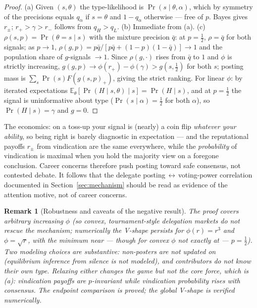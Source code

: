 \documentclass[12pt]{article}
\newtheorem{remark}{Remark}
\newcommand{\E}{\mathbb{E}}
\newcommand{\Pro}{\Pr}
\begin{document}
\begin{proof}
(a) Given $(s,\theta)$ the type-likelihood is $\Pro(s\mid\theta,\alpha)$, which
by symmetry of the precisions equals $q_\alpha$ if $s=\theta$ and $1-q_\alpha$
otherwise --- free of $p$. Bayes gives $r_\pm$; $r_+>\gamma>r_-$ follows from
$q_H>q_L$. (b) Immediate from (a). (c) $\rho(s,p)=\Pro(\theta=s\mid s)$ with the
mixture precision $\bar q$: at $p=\tfrac12$, $\rho=\bar q$ for both signals; as
$p\to1$, $\rho(g,p)=p\bar q/[p\bar q+(1-p)(1-\bar q)]\to1$ and the population
share of $g$-signals $\to1$. Since $\rho(g,\cdot)$ rises from $\bar q$ to $1$
and $\phi$ is strictly increasing, $g(g,p)\to\phi(r_+)-\phi(\gamma)>g(s,\tfrac12)$
for both $s$; posting mass is $\sum_s\Pro(s)F(g(s,p)_+)$, giving the strict
ranking. For linear $\phi$: by iterated expectations
$\E_\theta[\Pro(H\mid s,\theta)\mid s]=\Pro(H\mid s)$, and at $p=\tfrac12$ the
signal is uninformative about type ($\Pro(s\mid\alpha)=\tfrac12$ for both
$\alpha$), so $\Pro(H\mid s)=\gamma$ and $g=0$.
\end{proof}

The economics: on a toss-up your signal is (nearly) a coin flip \emph{whatever
your ability}, so being right is barely diagnostic in expectation --- and the
reputational payoffs $r_\pm$ from vindication are the same everywhere, while the
\emph{probability} of vindication is maximal when you hold the majority view on
a foregone conclusion. Career concerns therefore push posting toward safe
consensus, not contested debate. It follows that the delegate
posting$\,\leftrightarrow\,$voting-power correlation documented in
Section~\ref{sec:mechanism} should be read as evidence of the attention motive,
not of career concerns.

\begin{remark}[Robustness and caveats of the negative result]
The proof covers arbitrary increasing $\phi$ (so convex, tournament-style
delegation markets do not rescue the mechanism; numerically the V-shape persists
for $\phi(r)=r^3$ and $\phi=\sqrt{r}$, with the minimum near --- though for
convex $\phi$ not exactly at --- $p=\tfrac12$). Two modeling choices are
substantive: non-posters are not updated on (equilibrium inference from silence
is not modeled), and contributors do not know their own type. Relaxing either
changes the game but not the core force, which is (a): vindication payoffs are
$p$-invariant while vindication probability rises with consensus. The endpoint comparison is proved; the global V-shape is verified
numerically.
\end{remark}
\end{document}
